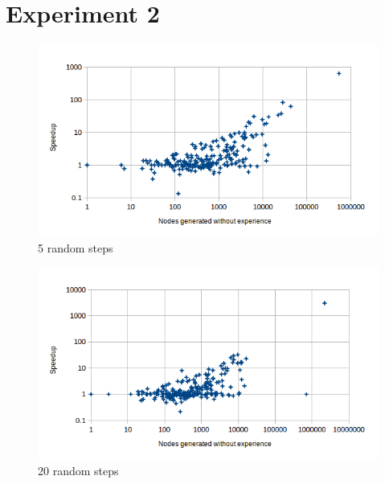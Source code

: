 \documentclass[letterpaper]{article}
\begin{document}
\section{Experiment 2}

\begin{figure}
	\begin{center}
	\includegraphics[scale=0.5]{Speedup_100_5.png}
	\end{center}
	\caption{5 random steps}
	 \label{fig:s_100_5}
\end{figure}

\begin{figure}
	\begin{center}
	\includegraphics[scale=0.5]{Speedup_100_20.png}
	\end{center}
	\caption{20 random steps}
	 \label{fig:s_100_20}
\end{figure}
\end{document}
